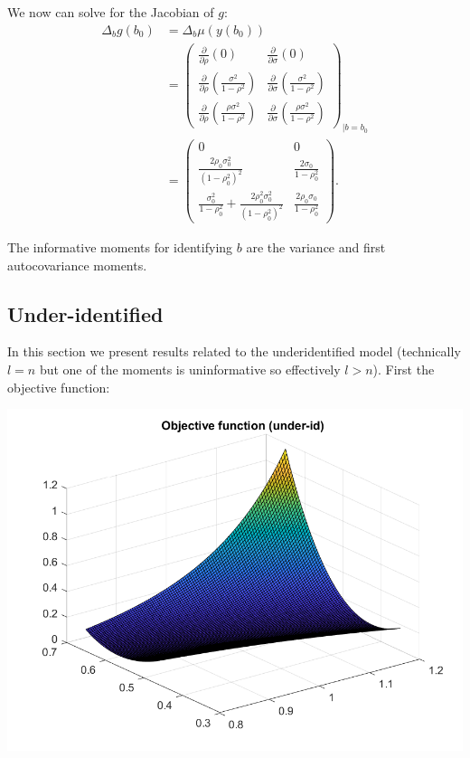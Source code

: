 \documentclass[11pt]{article} %
\begin{document}
We now can solve for the Jacobian of $g$:
\begin{align*}
\Delta_b g(b_0) &= \Delta_b \mu(y(b_0))\\
&= \begin{pmatrix} \frac{\partial }{\partial \rho} \left(0\right) &  \frac{\partial }{\partial \sigma} \left(0\right)  \\  \frac{\partial }{\partial \rho} \left(\frac{\sigma^2}{1-\rho^2}\right) &  \frac{\partial }{\partial \sigma} \left(\frac{\sigma^2}{1-\rho^2}\right) \\  \frac{\partial }{\partial \rho} \left(\frac{\rho\sigma^2}{1-\rho^2}\right) &  \frac{\partial }{\partial \sigma} \left(\frac{\rho \sigma^2}{1-\rho^2}\right) \end{pmatrix}_{|b=b_0}  \\
&= \begin{pmatrix} 0 & 0  \\  \frac{2\rho_0 \sigma_0^2}{(1-\rho_0^2)^2} &  \frac{2\sigma_0}{1-\rho_0^2} \\ \frac{\sigma_0^2}{1-\rho_0^2} + \frac{2\rho_0^2\sigma_0^2}{(1-\rho_0^2)^2}  &  \frac{2 \rho_0 \sigma_0}{1-\rho_0^2} \end{pmatrix}.
\end{align*}

The informative moments for identifying $b$ are the variance and first autocovariance moments.

\subsection{Under-identified}
In this section we present results related to the underidentified model (technically $l=n$ but one of the moments is uninformative so effectively $l>n$). First the objective function:

\includegraphics{obj_un}
\end{document}

